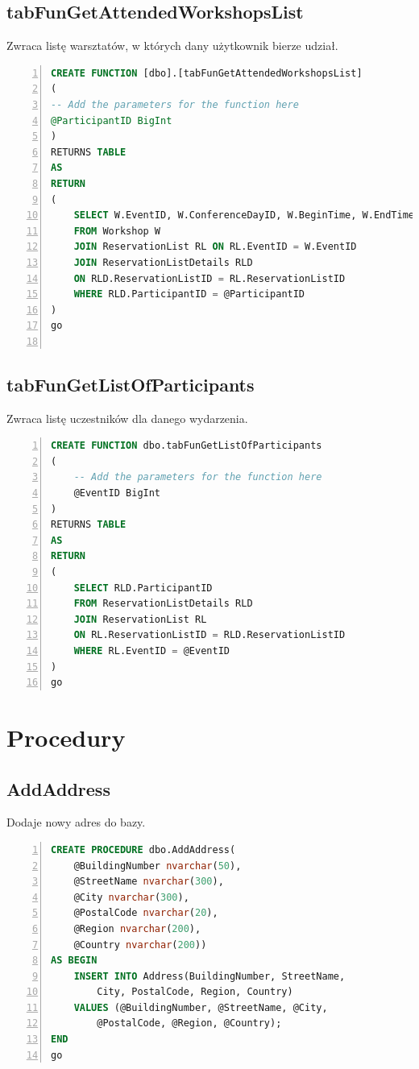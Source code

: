 \documentclass[]{article}
\begin{document}
	\subsection{tabFunGetAttendedWorkshopsList}
	Zwraca listę warsztatów, w których dany użytkownik bierze udział.
	\begin{lstlisting}[language=SQL,
	showspaces=false,
	basicstyle=\ttfamily,
	numbers=left,
	numberstyle=\tiny,
	tabsize=2,
	backgroundcolor=\color{lightg},
	keywordstyle=\color{lightblue},
	commentstyle=\color{gray}]
CREATE FUNCTION [dbo].[tabFunGetAttendedWorkshopsList]
(	
-- Add the parameters for the function here
@ParticipantID BigInt
)
RETURNS TABLE 
AS
RETURN 
(
	SELECT W.EventID, W.ConferenceDayID, W.BeginTime, W.EndTime, W.Price
	FROM Workshop W
	JOIN ReservationList RL ON RL.EventID = W.EventID
	JOIN ReservationListDetails RLD
	ON RLD.ReservationListID = RL.ReservationListID
	WHERE RLD.ParticipantID = @ParticipantID
)
go
	
	\end{lstlisting}
	
	\subsection{tabFunGetListOfParticipants}
	Zwraca listę uczestników dla danego wydarzenia.
	\begin{lstlisting}[language=SQL,
	showspaces=false,
	basicstyle=\ttfamily,
	numbers=left,
	numberstyle=\tiny,
	tabsize=2,
	backgroundcolor=\color{lightg},
	keywordstyle=\color{lightblue},
	commentstyle=\color{gray}]
CREATE FUNCTION dbo.tabFunGetListOfParticipants
(	
	-- Add the parameters for the function here
	@EventID BigInt
)
RETURNS TABLE 
AS
RETURN 
(
	SELECT RLD.ParticipantID
	FROM ReservationListDetails RLD
	JOIN ReservationList RL
	ON RL.ReservationListID = RLD.ReservationListID
	WHERE RL.EventID = @EventID
)
go
	\end{lstlisting}
	
\section{Procedury}
	\subsection{AddAddress}
	Dodaje nowy adres do bazy.
	\begin{lstlisting}[language=SQL,
						showspaces=false,
						basicstyle=\ttfamily,
						numbers=left,
						numberstyle=\tiny,
						backgroundcolor=\color{lightg},
						keywordstyle=\color{lightblue},
						commentstyle=\color{gray}]
CREATE PROCEDURE dbo.AddAddress(
	@BuildingNumber nvarchar(50),
	@StreetName nvarchar(300),
	@City nvarchar(300),
	@PostalCode nvarchar(20),
	@Region nvarchar(200),
	@Country nvarchar(200))
AS BEGIN
	INSERT INTO Address(BuildingNumber, StreetName,
		City, PostalCode, Region, Country)
	VALUES (@BuildingNumber, @StreetName, @City,
		@PostalCode, @Region, @Country);
END
go
	\end{lstlisting}
	
\end{document}
